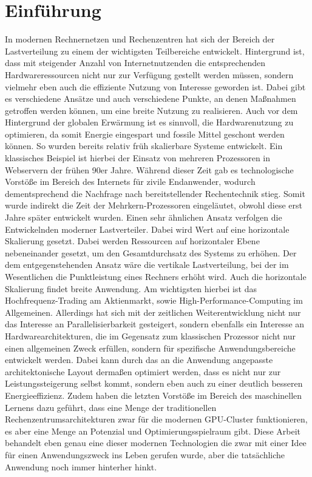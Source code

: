 %
%

\chapter{Einführung}
\label{cha:introduction}

In modernen Rechnernetzen und Rechenzentren hat sich der Bereich der Lastverteilung zu einem der wichtigsten Teilbereiche entwickelt. Hintergrund ist, dass mit steigender Anzahl von Internetnutzenden die entsprechenden Hardwareressourcen nicht nur zur Verfügung gestellt werden müssen, sondern vielmehr eben auch die effiziente Nutzung von Interesse geworden ist. Dabei gibt es verschiedene Ansätze und auch verschiedene Punkte, an denen Maßnahmen getroffen werden können, um eine breite Nutzung zu realisieren. Auch vor dem Hintergrund der globalen Erwärmung ist es sinnvoll, die Hardwarenutzung zu optimieren, da somit Energie eingespart und fossile Mittel geschont werden können. \newline \newline
So wurden bereits relativ früh skalierbare Systeme entwickelt. Ein klassisches Beispiel ist hierbei der Einsatz von mehreren Prozessoren in Webservern der frühen 90er Jahre. Während dieser Zeit gab es technologische Vorstöße im Bereich des Internets für zivile Endanwender, wodurch dementsprechend die Nachfrage nach bereitstellender Rechentechnik stieg. Somit wurde indirekt die Zeit der Mehrkern-Prozessoren eingeläutet, obwohl diese erst Jahre später entwickelt wurden. Einen sehr ähnlichen Ansatz verfolgen die Entwickelnden moderner Lastverteiler. Dabei wird Wert auf eine horizontale Skalierung gesetzt. Dabei werden Ressourcen auf horizontaler Ebene nebeneinander gesetzt, um den Gesamtdurchsatz des Systems zu erhöhen. Der dem entgegenstehenden Ansatz wäre die vertikale Lastverteilung, bei der im Wesentlichen die Punktleistung eines Rechners erhöht wird. Auch die horizontale Skalierung findet breite Anwendung. Am wichtigsten hierbei ist das Hochfrequenz-Trading am Aktienmarkt, sowie High-Performance-Computing im Allgemeinen. \newline \newline Allerdings hat sich mit der zeitlichen Weiterentwicklung nicht nur das Interesse an Parallelisierbarkeit gesteigert, sondern ebenfalls ein Interesse an Hardwarearchitekturen, die im Gegensatz zum klassischen Prozessor nicht nur einen allgemeinen Zweck erfüllen, sondern für spezifische Anwendungsbereiche entwickelt werden. Dabei kann durch das an die Anwendung angepasste architektonische Layout dermaßen optimiert werden, dass es nicht nur zur Leistungssteigerung selbst kommt, sondern eben auch zu einer deutlich besseren Energieeffizienz. Zudem haben die letzten Vorstöße im Bereich des maschinellen Lernens dazu geführt, dass eine Menge der traditionellen Rechenzentrumsarchitekturen zwar für die modernen GPU-Cluster funktionieren, es aber eine Menge an Potenzial und Optimierungsspielraum gibt. \newline \newline Diese Arbeit behandelt eben genau eine dieser modernen Technologien die zwar mit einer Idee für einen Anwendungszweck ins Leben gerufen wurde, aber die tatsächliche Anwendung noch immer hinterher hinkt.